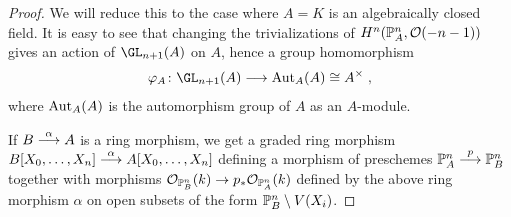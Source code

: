 \documentclass[a4paper,parskip=half,numbers=enddot, DIV=12]{scrreprt}
\begin{document}
\begin{proof}
	We will reduce this to the case where $A=K$ is an algebraically closed field. It is easy to see that changing the trivializations of $H^n(\mathbb{P}_A^n,\mathcal{O}(-n-1))$ gives an action of $\GL_{n+1}(A)$ on $A$, hence a group homomorphism 
	\begin{align*}
		\phi_A\colon \GL_{n+1}(A)\morphism\Aut_A(A)\cong A^\times\;,
	\end{align*}
	where $\operatorname{Aut}_A(A)$ is the automorphism group of $A$ as an $A$-module. 
	
	If $B\morphism[\alpha]A$ is a ring morphism, we get a graded ring morphism $B[X_0,\ldots,X_n]\morphism[\alpha] A[X_0,\ldots,X_n]$ defining a morphism of preschemes $\IP_A^n\morphism[p]\IP_B^n$ together with morphisms $\Oo_{\IP_B^n}(k)\morphism p_*\Oo_{\IP_A^n}(k)$ defined by the above ring morphism $\alpha$ on open subsets of the form $\mathbb{P}_B^n\setminus V(X_i)$. 
	

\end{proof}
\end{document}
